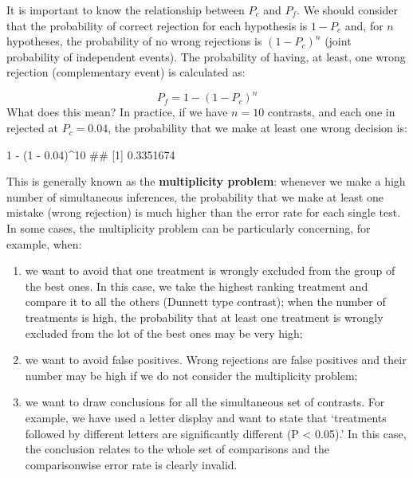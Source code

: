 \documentclass[a4paper,12pt,oneside]{book}
\providecommand{\tightlist}{%
  \setlength{\itemsep}{0pt}\setlength{\parskip}{0pt}}
\newenvironment{Shaded}{\begin{snugshade}}{\end{snugshade}}
\newcommand{\DecValTok}[1]{#1}
\newcommand{\FloatTok}[1]{#1}
\newcommand{\SpecialCharTok}[1]{#1}
\newcommand{\DocumentationTok}[1]{#1}
\newcommand{\NormalTok}[1]{#1}
\begin{document}
It is important to know the relationship between \(P_c\) and \(P_f\). We should consider that the probability of correct rejection for each hypothesis is \(1 - P_c\) and, for \(n\) hypotheses, the probability of no wrong rejections is \((1 - P_c)^n\) (joint probability of independent events). The probability of having, at least, one wrong rejection (complementary event) is calculated as:

\[P_f = 1 - (1 - P_c)^n\]
What does this mean? In practice, if we have \(n = 10\) contrasts, and each one in rejected at \(P_c = 0.04\), the probability that we make at least one wrong decision is:

\begin{Shaded}
\begin{Highlighting}[]
\DecValTok{1} \SpecialCharTok{{-}}\NormalTok{ (}\DecValTok{1} \SpecialCharTok{{-}} \FloatTok{0.04}\NormalTok{)}\SpecialCharTok{\^{}}\DecValTok{10}
\DocumentationTok{\#\# [1] 0.3351674}
\end{Highlighting}
\end{Shaded}

This is generally known as the \textbf{multiplicity problem}: whenever we make a high number of simultaneous inferences, the probability that we make at least one mistake (wrong rejection) is much higher than the error rate for each single test. In some cases, the multiplicity problem can be particularly concerning, for example, when:

\begin{enumerate}
\def\labelenumi{\arabic{enumi}.}
\tightlist
\item
  we want to avoid that one treatment is wrongly excluded from the group of the best ones. In this case, we take the highest ranking treatment and compare it to all the others (Dunnett type contrast); when the number of treatments is high, the probability that at least one treatment is wrongly excluded from the lot of the best ones may be very high;
\item
  we want to avoid false positives. Wrong rejections are false positives and their number may be high if we do not consider the multiplicity problem;
\item
  we want to draw conclusions for all the simultaneous set of contrasts. For example, we have used a letter display and want to state that `treatments followed by different letters are significantly different (P \textless{} 0.05).' In this case, the conclusion relates to the whole set of comparisons and the comparisonwise error rate is clearly invalid.
\end{enumerate}
\end{document}
